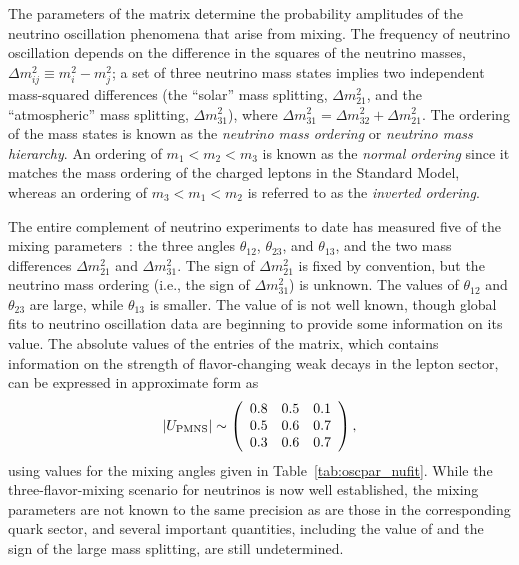 The parameters of the 
matrix determine the probability amplitudes of the neutrino
oscillation phenomena that arise from mixing.  The frequency of neutrino oscillation 
depends on the difference in the squares of the neutrino
masses, $\Delta m^{2}_{ij} \equiv m^{2}_{i} - m^{2}_{j}$; a set of three
neutrino mass states implies two independent mass-squared differences
(the ``solar'' mass splitting, $\Delta m^{2}_{21}$, and the ``atmospheric'' mass splitting, 
$\Delta m^{2}_{31}$), where $\Delta m^{2}_{31} = \Delta m^{2}_{32} + \Delta m^{2}_{21}$. The ordering of the
mass states is known as the \emph{neutrino mass ordering} or \emph{neutrino mass hierarchy}. An ordering of
$m_1 < m_2 < m_3$ is known as the \emph{normal ordering} since it matches
the mass ordering of the charged leptons in the Standard Model, whereas an ordering of $m_3 < m_1 < m_2$
is referred to as the \emph{inverted ordering}.

The entire complement of neutrino experiments to date has measured
five of the mixing parameters~\cite{Esteban:2018azc,deSalas:2017kay,Capozzi:2017yic}: the three angles $\theta_{12}$,
$\theta_{23}$, and $\theta_{13}$, and the two mass differences
$\Delta m^{2}_{21}$ and $\Delta m^{2}_{31}$. The sign of $\Delta
m^{2}_{21}$ is fixed by convention, but the neutrino mass ordering (i.e., the sign of $\Delta m^{2}_{31}$) is unknown.
The values of $\theta_{12}$ and $\theta_{23}$ are large, while 
$\theta_{13}$ is smaller. The value of \deltacp is not well known, though global fits to neutrino oscillation data are beginning to provide some information on its value.
The absolute values of the entries of the  matrix, which
contains information on the strength of flavor-changing weak decays in
the lepton sector, can be expressed in approximate form as
\begin{equation}
|U_{\rm PMNS}|\sim \left(\begin{array}{ccc} 0.8 & 0.5 & 0.1 \\ 0.5 & 0.6 & 0.7 \\ 0.3 & 0.6 & 0.7\end{array} \right),
\label{eq:pmnsmatrix}
\end{equation}
using values for the mixing angles given in Table~\ref{tab:oscpar_nufit}. 
While the three-flavor-mixing scenario for neutrinos is now well
established, the mixing parameters are not known to the same precision 
as are those in the
corresponding quark sector, and several important quantities, including
the value of \deltacp and the sign of the large mass splitting, are
still undetermined. 

